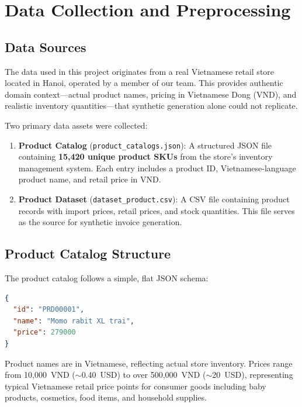 \documentclass[11pt,a4paper]{report}
\begin{document}
\chapter{Data Collection and Preprocessing}
\label{ch:data}

\section{Data Sources}

The data used in this project originates from a real Vietnamese retail store located in Hanoi, operated by a member of our team. This provides authentic domain context---actual product names, pricing in Vietnamese Dong (VND), and realistic inventory quantities---that synthetic generation alone could not replicate.

Two primary data assets were collected:

\begin{enumerate}
  \item \textbf{Product Catalog} (\texttt{product\_catalogs.json}): A structured JSON file containing \textbf{15,420 unique product SKUs} from the store's inventory management system. Each entry includes a product ID, Vietnamese-language product name, and retail price in VND.
  \item \textbf{Product Dataset} (\texttt{dataset\_product.csv}): A CSV file containing product records with import prices, retail prices, and stock quantities. This file serves as the source for synthetic invoice generation.
\end{enumerate}

\section{Product Catalog Structure}

The product catalog follows a simple, flat JSON schema:

\begin{lstlisting}[language=json, caption={Product catalog entry example.}, label={lst:catalog}]
{
  "id": "PRD00001",
  "name": "Momo rabit XL trai",
  "price": 279000
}
\end{lstlisting}

Product names are in Vietnamese, reflecting actual store inventory. Prices range from 10,000~VND ($\sim$0.40~USD) to over 500,000~VND ($\sim$20~USD), representing typical Vietnamese retail price points for consumer goods including baby products, cosmetics, food items, and household supplies.
\end{document}
